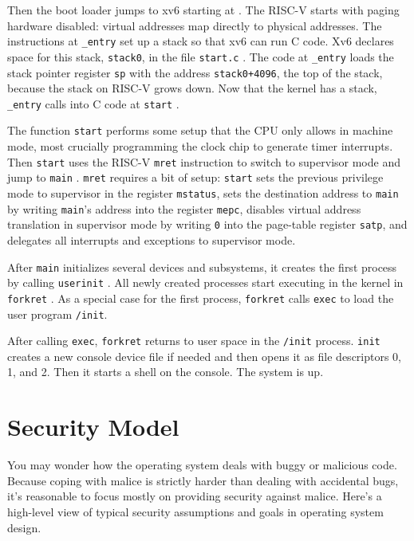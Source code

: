 Then the boot loader jumps to xv6 starting at
.
The RISC-V starts with paging hardware disabled:
virtual addresses map directly to physical addresses.
The instructions at
\lstinline{_entry}
set up a stack so that xv6 can run C code.
Xv6 declares space for this stack,
\lstinline{stack0},
in the file
\lstinline{start.c}
.
The code at
\lstinline{_entry}
loads the stack pointer register
\texttt{sp}
with the address
\lstinline{stack0+4096},
the top of the stack, because the stack
on RISC-V grows down.
Now that the kernel has a stack,
\lstinline{_entry}
calls into C code at
\lstinline{start}
.

The function
\lstinline{start}
performs some setup that the CPU only allows in machine mode,
most crucially programming the clock chip to generate
timer interrupts.
Then {\tt start} uses the RISC-V {\tt mret}
instruction to switch to supervisor mode and
jump to 
\lstinline{main}
.
{\tt mret} requires
a bit of setup:
{\tt start} sets the previous privilege mode to
supervisor in the register
\lstinline{mstatus},
sets the destination address to
\lstinline{main}
by writing
\lstinline{main}'s
address into
the register
\lstinline{mepc},
disables virtual address translation in supervisor mode
by writing
\lstinline{0}
into the page-table register
\lstinline{satp},
and delegates all interrupts and exceptions
to supervisor mode.

After
\lstinline{main}
initializes several devices and subsystems, 
it creates the first process by calling 
\lstinline{userinit}
.
All newly created processes start executing in the kernel in
\lstinline{forkret}
.
As a special case for the first process, {\tt forkret}
calls {\tt exec} to load the user program {\tt /init}.

After calling
\lstinline{exec},
{\tt forkret} returns to user space in
the \lstinline{/init} process.
\lstinline{init}
creates a new console device file
if needed
and then opens it as file descriptors 0, 1, and 2.
Then it starts a shell on the console.
The system is up.

\section{Security Model}

You may wonder how the operating system deals with buggy or malicious
code. Because coping with malice is strictly harder than dealing with
accidental bugs, it's reasonable to 
focus mostly on providing security against malice.
Here's a high-level view of typical security assumptions and
goals in operating system design.

